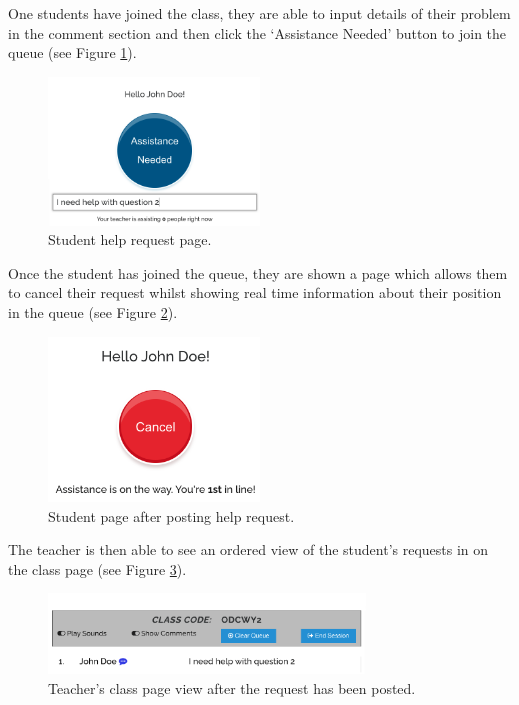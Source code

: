 One students have joined the class, they are able to input details of their problem in the comment section and then click the `Assistance Needed' button to join the queue (see Figure \ref{fig:cqbutton}).

\FloatBarrier
\begin{figure}[H]
  \centering
  \includegraphics[width=0.5\textwidth]{2context/images/cq4.png}
  \caption{Student help request page.}
  \label{fig:cqbutton}
\end{figure}

Once the student has joined the queue, they are shown a page which allows them to cancel their request whilst showing real time information about their position in the queue (see Figure \ref{fig:cqbutton2}).

\FloatBarrier
\begin{figure}[H]
  \centering
  \includegraphics[width=0.5\textwidth]{2context/images/cq5.png}
  \caption{Student page after posting help request.}
  \label{fig:cqbutton2}
\end{figure}

The teacher is then able to see an ordered view of the student's requests in on the class page (see Figure \ref{fig:cqclass}).

\FloatBarrier
\begin{figure}[H]
  \centering
  \includegraphics[width=0.75\textwidth]{2context/images/cq6.png}
  \caption{Teacher's class page view after the request has been posted.}
  \label{fig:cqclass}
\end{figure}

